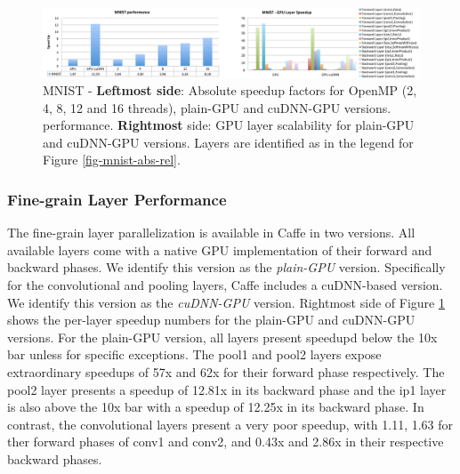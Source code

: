
\begin{figure}[]
\includegraphics[width=\textwidth]{figures/mnist-abs-perf+gpu-layer.pdf}
\caption{MNIST - \textbf{Leftmost side}: Absolute speedup factors for OpenMP (2, 4, 8, 12 and 16 threads), plain-GPU and cuDNN-GPU versions. performance. \textbf{Rightmost} side: GPU layer scalability for plain-GPU and cuDNN-GPU versions. Layers are identified as in the legend for Figure \ref{fig-mnist-abs-rel}.}
\label{fig-mnist-overall}
\end{figure}

\subsubsection{Fine-grain Layer Performance}
The fine-grain layer parallelization is available in Caffe in two versions. 
All available layers come with a native GPU implementation of their 
forward and backward phases. We identify this version as the \emph{plain-GPU} 
version. Specifically for the convolutional and pooling layers, Caffe 
includes a cuDNN-based version. We identify this version as the 
\emph{cuDNN-GPU} version. 
Rightmost side of Figure \ref{fig-mnist-overall} shows the per-layer 
speedup numbers for the plain-GPU and cuDNN-GPU versions. 
For the plain-GPU version, all layers present speedupd below 
the 10x bar unless for specific exceptions. The pool1 and pool2 
layers expose extraordinary speedups of 57x and 62x for their 
forward phase respectively. The pool2 layer presents a speedup of 
12.81x in its backward phase and the ip1 layer is also above the 
10x bar with a speedup of 12.25x in its backward phase.
In contrast, the convolutional layers present a very poor speedup, with 
1.11, 1.63 for ther forward phases of conv1 and conv2, and 0.43x and 2.86x 
in their respective backward phases. 

